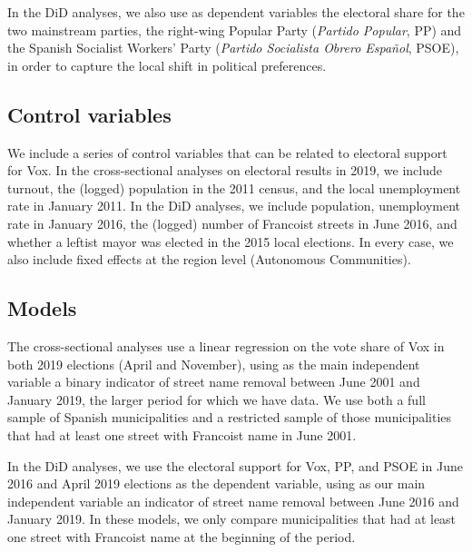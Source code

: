 \documentclass[12pt, notitlepage]{article}
\begin{document}
In the DiD analyses, we also use as dependent variables the electoral share for the two mainstream parties, the right-wing Popular Party (\textit{Partido Popular}, PP) and the Spanish Socialist Workers' Party (\textit{Partido Socialista Obrero Español}, PSOE), in order to capture the local shift in political preferences.

\subsection*{Control variables}

We include a series of control variables that can be related to electoral support for Vox.
In the cross-sectional analyses on electoral results in 2019, we include turnout, the (logged) population in the 2011 census, and the local unemployment rate in January 2011.
In the DiD analyses, we include population, unemployment rate in January 2016, the (logged) number of Francoist streets in June 2016, and whether a leftist mayor was elected in the 2015 local elections.
In every case, we also include fixed effects at the region level (Autonomous Communities).

\subsection*{Models}

The cross-sectional analyses use a linear regression on the vote share of Vox in both 2019 elections (April and November), using as the main independent variable a binary indicator of street name removal between June 2001 and January 2019, the larger period for which we have data.
We use both a full sample of Spanish municipalities and a restricted sample of those municipalities that had at least one street with Francoist name in June 2001.

In the DiD analyses, we use the electoral support for Vox, PP, and PSOE in June 2016 and April 2019 elections as the dependent variable, using as our main independent variable an indicator of street name removal between June 2016 and January 2019.
In these models, we only compare municipalities that had at least one street with Francoist name at the beginning of the period.
\end{document}
